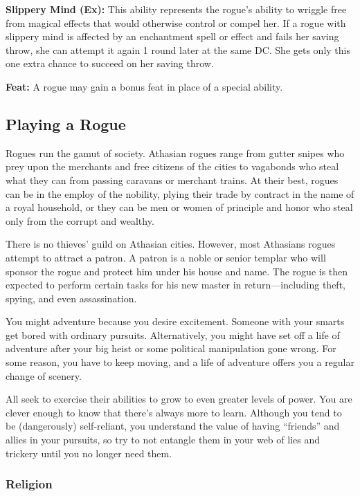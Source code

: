 \textbf{Slippery Mind (Ex):} This ability represents the rogue’s ability to wriggle free from magical effects that would otherwise control or compel her. If a rogue with slippery mind is affected by an enchantment spell or effect and fails her saving throw, she can attempt it again 1 round later at the same DC. She gets only this one extra chance to succeed on her saving throw.

\textbf{Feat:} A rogue may gain a bonus feat in place of a special ability.

\subsection{Playing a Rogue}

Rogues run the gamut of society. Athasian rogues range from gutter snipes who prey upon the merchants and free citizens of the cities to vagabonds who steal what they can from passing caravans or merchant trains. At their best, rogues can be in the employ of the nobility, plying their trade by contract in the name of a royal household, or they can be men or women of principle and honor who steal only from the corrupt and wealthy.

There is no thieves’ guild on Athasian cities. However, most Athasians rogues attempt to attract a patron. A patron is a noble or senior templar who will sponsor the rogue and protect him under his house and name. The rogue is then expected to perform certain tasks for his new master in return—including theft, spying, and even assassination.

You might adventure because you desire excitement. Someone with your smarts get bored with ordinary pursuits. Alternatively, you might have set off a life of adventure after your big heist or some political manipulation gone wrong. For some reason, you have to keep moving, and a life of adventure offers you a regular change of scenery.

All seek to exercise their abilities to grow to even greater levels of power. You are clever enough to know that there’s always more to learn. Although you tend to be (dangerously) self‐reliant, you understand the value of having “friends” and allies in your pursuits, so try to not entangle them in your web of lies and trickery until you no longer need them.

\subsubsection{Religion}

